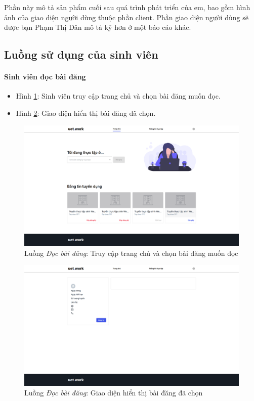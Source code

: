 \documentclass[./../main.tex]{subfiles}
\begin{document}
Phần này mô tả sản phẩm cuối sau quá trình phát triển của em, bao gồm
hình ảnh của giao diện người dùng thuộc phần client. Phần giao diện
người dùng sẽ được bạn Phạm Thị Dân mô tả kỹ hơn ở một báo cáo khác.

\subsection{Luồng sử dụng của sinh viên}

\paragraph*{Sinh viên đọc bài đăng}

\begin{itemize}
\item Hình \ref{fig:student_home_page}: Sinh viên truy cập trang chủ và chọn bài đăng muốn đọc.
\item Hình \ref{fig:student_read_post_page}: Giao diện hiển thị bài đăng đã chọn.
\end{itemize}

\begin{figure}[]
	\includegraphics[width=\linewidth]{./images/image37.png}
	\caption{Luồng \emph{Đọc bài đăng}: Truy cập trang chủ và chọn bài đăng muốn đọc}
	\label{fig:student_home_page}
\end{figure}

\begin{figure}[]
	\includegraphics[width=\linewidth]{./images/image38.png} %
	\caption{Luồng \emph{Đọc bài đăng}: Giao diện hiển thị bài đăng đã chọn}
	\label{fig:student_read_post_page}
\end{figure}
\end{document}
